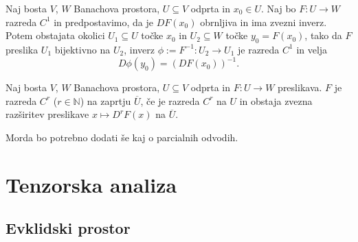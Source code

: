 \begin{izrek}
	Naj bosta $V$, $W$ Banachova prostora, $U\subseteq V$ odprta in $x_0\in U$. Naj bo
	$F\colon U\to W$ razreda $C^1$ in predpostavimo, da je $DF(x_0)$ obrnljiva in
	ima zvezni inverz. Potem obstajata okolici $U_1\subseteq U$ točke $x_0$ in
	$U_2\subseteq W$ točke $y_0=F(x_0)$, tako da $F$ preslika $U_1$ bijektivno na
	$U_2$, inverz $\phi:=F^{-1}\colon U_2\to U_1$ je razreda $C^1$ in velja
	\[ D\phi(y_0)=(DF(x_0))^{-1}. \]
\end{izrek}

\begin{definicija}
	Naj bosta $V$, $W$ Banachova prostora, $U\subseteq V$ odprta in $F\colon U\to W$ preslikava. 
	$F$ je razreda $C^r$ ($r\in\mathbb{N}$) na zaprtju $\overline{U}$, če je razreda $C^r$ na $U$ in
	obstaja zvezna razširitev preslikave $x\mapsto D^rF(x)$ na $\overline{U}$.
\end{definicija}

\textcolor[rgb]{1,0,0}{Morda bo potrebno dodati še kaj o parcialnih odvodih.}
\begin{comment}
Naj bosta $(V_1,\|\cdot\|_1)$, $(V_2,\|\cdot\|_2)$ Banachova prostora. $V=V_1\times V_2$
je vektorski prostor, z ustrezno definirano normo $\|\cdot\|_V$, porojeno iz norm $\|\cdot\|_1$ in $\|\cdot\|_2$,
pa postane Banachov prostor. Naj bo $F\colon U\to W$, kjer je $U\subseteq V$ odprta množica, in naj bosta
\[ U_1=\{x\in V_1\;;\ (x,y_0)\in U\}\quad\textrm{ter}\quad U_2=\{y\in V_2\;;\ (x_0,y)\in U\}. \]
Če v točki $(x_0,y_0)\in U$ obstajata
\begin{itemize}
\item odvod preslikave $F(\cdot,y_0)\colon U_1\to W$, ki ga označimo z $\partial_1 F(x_0,y_0)$ in
\item odvod preslikave $F(x_0,\cdot)\colon U_2\to W$, ki ga označimo z $\partial_2 F(x_0,y_0)$
\end{itemize}
in sta oba zvezna, potem je $F$ odvedljiva v $(x_0,y_0)$ in velja
\[ DF(x_0,y_0)(u,v)=\partial_1 F(x_0,y_0)(u)+\partial_2 F(x_0,y_0)(v). \]
\end{comment}


\section{Tenzorska analiza}


\subsection{Evklidski prostor}


